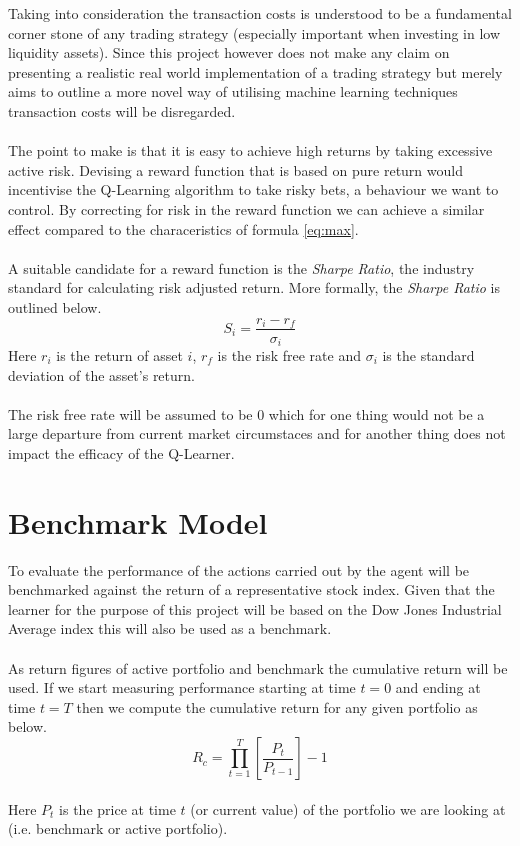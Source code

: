 \documentclass[dvips,12pt]{article}
\begin{document}
Taking into consideration the transaction costs is understood to be a fundamental corner stone of any trading strategy (especially important when investing in low liquidity assets). Since this project however does not make any claim on presenting a realistic real world implementation of a trading strategy but merely aims to outline a more novel way of utilising machine learning techniques transaction costs will be disregarded.
\\\\
The point to make is that it is easy to achieve high returns by taking excessive active risk. Devising a reward function that is based on pure return would incentivise the Q-Learning algorithm to take risky bets, a behaviour we want to control. 
By correcting for risk in the reward function we can achieve a similar effect compared to the characeristics of formula \ref{eq:max}.
\\\\
A suitable candidate for a reward function is the \emph{Sharpe Ratio}, the industry standard for calculating risk adjusted return. More formally, the \emph{Sharpe Ratio} is outlined below.
\begin{equation}
	S_i = \frac{r_i - r_f}{\sigma_i}
\end{equation}
Here $r_i$ is the return of asset $i$, $r_f$ is the risk free rate and $\sigma_i$ is the standard deviation of the asset's return.
\\\\
The risk free rate will be assumed to be $0$ which for one thing would not be a large departure from current market circumstaces and for another thing does not impact the efficacy of the Q-Learner.

\section{Benchmark Model}
To evaluate the performance of the actions carried out by the agent will be benchmarked against the return of a representative stock index. Given that the learner for the purpose of this project will be based on the Dow Jones Industrial Average index this will also be used as a benchmark.
\\\\
As return figures of active portfolio and benchmark the cumulative return will be used. If we start measuring performance starting at time $t = 0$ and ending at time $t=T$ then we compute the cumulative return for any given portfolio as below.
\begin{equation}
	R_c = \prod_{t=1}^{T}{\left[\frac{P_t}{P_{t-1}}\right]} - 1
\end{equation}
~\\
Here $P_t$ is the price at time $t$ (or current value) of the portfolio we are looking at (i.e. benchmark or active portfolio).
\end{document}
